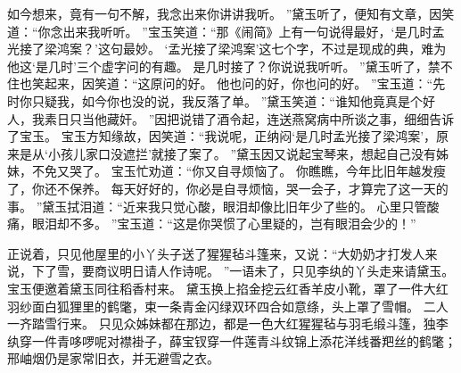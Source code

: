 如今想来，竟有一句不解，我念出来你讲讲我听。
”黛玉听了，便知有文章，因笑道：“你念出来我听听。
”宝玉笑道：“那《闹简》上有一句说得最好，‘是几时孟光接了梁鸿案？’这句最妙。
‘孟光接了梁鸿案’这七个字，不过是现成的典，难为他这‘是几时’三个虚字问的有趣。
是几时接了？你说说我听听。
”黛玉听了，禁不住也笑起来，因笑道：“这原问的好。
他也问的好，你也问的好。
”宝玉道：“先时你只疑我，如今你也没的说，我反落了单。
”黛玉笑道：“谁知他竟真是个好人，我素日只当他藏奸。
”因把说错了酒令起，连送燕窝病中所谈之事，细细告诉了宝玉。
宝玉方知缘故，因笑道：“我说呢，正纳闷‘是几时孟光接了梁鸿案’，原来是从‘小孩儿家口没遮拦’就接了案了。
”黛玉因又说起宝琴来，想起自己没有姊妹，不免又哭了。
宝玉忙劝道：“你又自寻烦恼了。
你瞧瞧，今年比旧年越发瘦了，你还不保养。
每天好好的，你必是自寻烦恼，哭一会子，才算完了这一天的事。
”黛玉拭泪道：“近来我只觉心酸，眼泪却像比旧年少了些的。
心里只管酸痛，眼泪却不多。
”宝玉道：“这是你哭惯了心里疑的，岂有眼泪会少的！”\par
正说着，只见他屋里的小丫头子送了猩猩毡斗篷来，又说：“大奶奶才打发人来说，下了雪，要商议明日请人作诗呢。
”一语未了，只见李纨的丫头走来请黛玉。
宝玉便邀着黛玉同往稻香村来。
黛玉换上掐金挖云红香羊皮小靴，罩了一件大红羽纱面白狐狸里的鹤氅，束一条青金闪绿双环四合如意绦，头上罩了雪帽。
二人一齐踏雪行来。
只见众姊妹都在那边，都是一色大红猩猩毡与羽毛缎斗篷，独李纨穿一件青哆啰呢对襟褂子，薛宝钗穿一件莲青斗纹锦上添花洋线番羓丝的鹤氅；邢岫烟仍是家常旧衣，并无避雪之衣。
